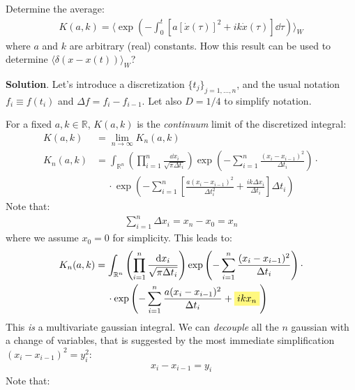 \documentclass[../template.tex]{subfiles}
\begin{document}
\begin{exo}
    Determine the average:
    \begin{align}
        K(a,k) = \langle \exp\left(-\int_0^t [a[\dot{x}(\tau)]^2 + ik \dot{x}(\tau)]\dd{\tau}\right) \rangle_W  \label{eqn:Kdef}
    \end{align}
    where $a$ and $k$ are arbitrary (real) constants. How this result can be used to determine $\langle \delta(x-x(t)) \rangle_W$?

    \medskip

    \textbf{Solution}. Let's introduce a discretization $\{t_j\}_{j=1,\dots,n}$, and the usual notation $f_i \equiv f(t_i)$ and $\Delta f = f_{i} - f_{i-1}$. Let also $D=1/4$ to simplify notation.

    For a fixed $a, k \in \mathbb{R}$, $K(a,k)$ is the \textit{continuum} limit of the discretized integral:
    \begin{align*}
        K(a,k) &= \lim_{n \to \infty} K_n(a,k)\\
        K_n(a,k) &= \int_{\mathbb{R}^n} \left(\prod_{i=1}^n \frac{\dd{x_i}}{\sqrt{\pi \Delta t_i}} \right) \exp \left(-\sum_{i=1}^n \frac{(x_i - x_{i-1})^2}{\Delta t_i} \right) \cdot \\
        &\quad \> \cdot \exp\left(-\sum_{i=1}^n \left[ \frac{a(x_i - x_{i-1})^2}{\Delta t_i^2}  + \frac{ik \Delta x_i}{\Delta t_i} \right] \Delta t_i\right)
    \end{align*} 
    Note that:
    \begin{align*}
        \sum_{i=1}^n \Delta x_i = x_n - x_0 = x_n
    \end{align*}
    where we assume $x_0 = 0$ for simplicity. This leads to:
    \begin{align*}
        K_n(a,k) &= \int_{\mathbb{R}^n} \left(\prod_{i=1}^n \frac{\dd{x_i}}{\sqrt{\pi \Delta t_i}} \right) \exp \left(-\sum_{i=1}^n \frac{(x_i - x_{i-1})^2}{\Delta t_i} \right) \cdot\\
        &\quad \> \cdot \exp \left(-\sum_{i=1}^n \frac{a (x_i - x_{i-1})^2}{\Delta t_i} + \hlc{Yellow}{i k x_n}\right)
    \end{align*}
    This \textit{is} a multivariate gaussian integral. We can \textit{decouple} all the $n$ gaussian with a change of variables, that is suggested by the most immediate simplification $(x_i - x_{i-1})^2 = y_i^2$:
    \begin{align*}
        x_i - x_{i-1} = y_i
    \end{align*} 
    Note that:
    \begin{align*}

\end{align*}
\end{exo}
\end{document}
